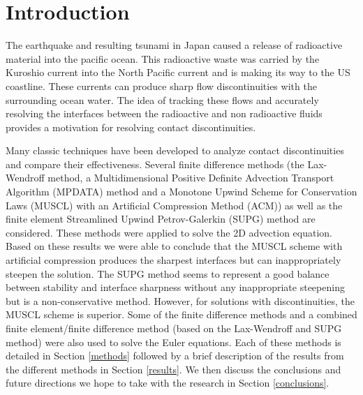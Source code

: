 \section{Introduction}
\label{intro}

The earthquake and resulting tsunami in Japan caused a release of radioactive material into the pacific ocean. This radioactive waste was carried by the Kuroshio current into the North Pacific current and is making its way to the US coastline. These currents can produce sharp flow discontinuities with the surrounding ocean water. The idea of tracking these flows and accurately resolving the  interfaces between the radioactive and non radioactive fluids provides a motivation for resolving contact discontinuities.

Many classic techniques have been developed to analyze contact discontinuities and compare their effectiveness. Several finite difference methods (the Lax-Wendroff method, a Multidimensional Positive Definite Advection Transport Algorithm (MPDATA) method and a Monotone Upwind Scheme for Conservation Laws (MUSCL) with an Artificial Compression Method (ACM)) as well as the finite element Streamlined Upwind Petrov-Galerkin (SUPG) method are considered. These methods were applied to solve the 2D advection equation. Based on these results we were able to conclude that the MUSCL scheme with artificial compression produces the sharpest interfaces but can inappropriately steepen the solution. The SUPG method seems to represent a good balance between stability and interface sharpness without any inappropriate steepening but is a non-conservative method. However, for solutions with discontinuities, the MUSCL scheme is superior. Some of the finite difference methods and a combined finite element/finite difference method (based on the Lax-Wendroff and SUPG method) were also used to solve the Euler equations. Each of these methods is detailed in Section \ref{methods} followed by a brief description of the results from the different methods in Section \ref{results}. We then discuss the conclusions and future directions we hope to take with the research in Section \ref{conclusions}.


